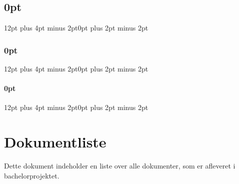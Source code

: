 
\usepackage[explicit]{titlesec}
\usepackage{longtable,tabu}
\usepackage{longtable}
\usepackage{todonotes}

\titlespacing\section{0pt}{12pt plus 4pt minus 2pt}{0pt plus 2pt minus 2pt}
\titlespacing\subsection{0pt}{12pt plus 4pt minus 2pt}{0pt plus 2pt minus 2pt}
\titlespacing\subsubsection{0pt}{12pt plus 4pt minus 2pt}{0pt plus 2pt minus 2pt}
\raggedbottom




\chapter{Dokumentliste}
Dette dokument indeholder en liste over alle dokumenter, som er afleveret i bachelorprojektet. 

